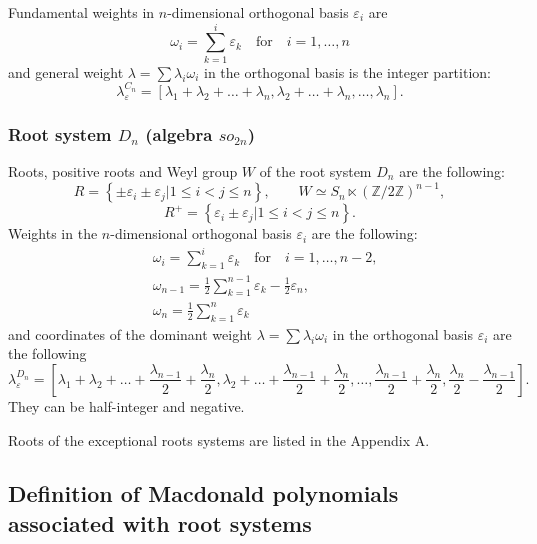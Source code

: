 \documentclass{article}
\def\ve{\varepsilon}
\def\ep{\varepsilon}
\begin{document}
Fundamental weights in $n$-dimensional orthogonal basis $\ep_i$ are
\begin{equation}
    \omega_i = \sum_{k=1}^i \ep_k \quad \text{for}\quad i=1,\dots,n
\end{equation}
and general weight $\lambda = \sum \lambda_i \omega_i$ in the orthogonal basis is the integer partition:
\begin{equation}
  \lambda^{C_n}_{\ve} =   \left [\lambda_1+\lambda_2+\dots+\lambda_n,\lambda_2+\dots+\lambda_n,\dots,\lambda_n \right].
   \label{weightC}
\end{equation}


\subsubsection{Root system $D_n$ (algebra $so_{2n}$)}
Roots, positive roots and Weyl group $W$ of the root system $D_n$ are the following:
\begin{equation}
    R = \left\{\pm \ve_i\pm \ve_j| 1\leq i < j \leq n\right\}, \quad\quad W \simeq S_{n} \ltimes (\mathbb{Z}/2\mathbb{Z})^{n-1},\end{equation}
    \begin{equation}
    R^+ = \left\{ \ve_i\pm \ve_j| 1\leq i < j \leq n\right\}. \label{rootsDplus}
    \end{equation}
Weights in the $n$-dimensional orthogonal basis $\ep_i$ are the following:
\begin{align}
   & \omega_i = \sum_{k=1}^i \ep_k \quad \text{for} \quad i=1,\dots,n-2, \\
   &\omega_{n-1} = \frac{1}{2} \sum_{k=1}^{n-1} \ep_k -\frac{1}{2} \ep_n   ,\\
   & \omega_{n} = \frac{1}{2} \sum_{k=1}^{n} \ep_k
\end{align}
and coordinates of the dominant weight $\lambda = \sum \lambda_i \omega_i$ in the orthogonal basis $\ve_i$ are the following
\begin{equation}
  \lambda^{D_n}_{\ve} = \left [\lambda_1+\lambda_2+\dots+\frac{\lambda_{n-1}}{2}+\frac{\lambda_n}{2},\lambda_2+\dots+\frac{\lambda_{n-1}}{2}+\frac{\lambda_n}{2},\dots,\frac{\lambda_{n-1}}{2}+\frac{\lambda_n}{2}, \frac{\lambda_n}{2}-\frac{\lambda_{n-1}}{2} \right].
   \label{weightD}
\end{equation}
They can be half-integer and negative.

Roots of the exceptional roots systems are listed in the Appendix A.

\subsection{Definition of Macdonald polynomials associated with root systems}
\end{document}
